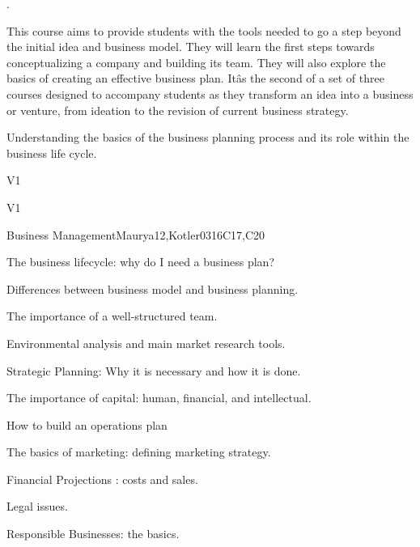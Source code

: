 \begin{syllabus}


\begin{justification}
.
\end{justification}
This course aims to provide students with the tools needed to go a step beyond the initial idea and business model. They will learn the first steps towards conceptualizing a company and building its team. They will also explore the basics of creating an effective business plan. Itâs the second of a set of three courses
designed to accompany students as they transform an idea into a business or venture, from ideation to the revision of current business strategy.
\begin{goals}
\item Understanding the basics of the business planning process and its role within the business life cycle.
\end{goals}

\begin{outcomes}{V1}
   \item {}
   \item {}
   \item {}
\end{outcomes}

\begin{competences}{V1}
    \item {}
    \item {}
    \item {}
\end{competences}

\begin{unit}{Business Management}{}{Maurya12,Kotler03}{16}{C17,C20}
\begin{topics}
      \item The business lifecycle: why do I need a business plan?
      \item Differences between business model and business planning.
      \item The importance of a well-structured team.
      \item Environmental analysis and main market research tools.
      \item Strategic Planning: Why it is necessary and how it is done.
      \item The importance of capital: human, financial, and intellectual.
      \item How to build an operations plan
      \item The basics of marketing: defining marketing strategy.
      \item Financial Projections : costs and sales.
      \item Legal issues.
      \item Responsible Businesses: the basics.
\end{topics}


\end{unit}
\end{syllabus}
